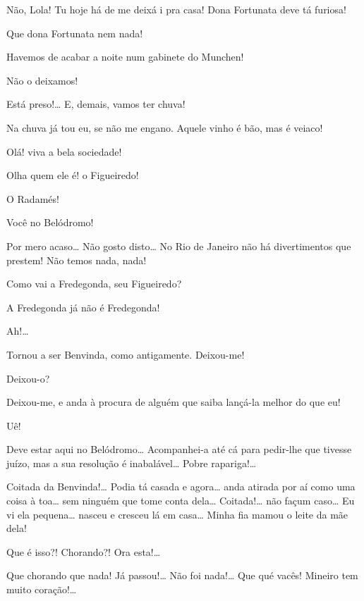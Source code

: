  Não, Lola! Tu hoje há de me deixá i pra casa! Dona Fortunata deve
tá furiosa!

 Que dona Fortunata nem nada!

 Havemos de acabar a noite num gabinete do Munchen!

 Não o deixamos!

 Está preso!\ldots{} E, demais, vamos ter chuva!

 Na chuva já tou eu, se não me engano. Aquele vinho é bão, mas é
veiaco!

  Olá! viva a bela sociedade!

 Olha quem ele é! o Figueiredo!

 O Radamés!

 Você no Belódromo!

 Por mero acaso\ldots{} Não gosto disto\ldots{} No Rio de Janeiro não há
divertimentos que prestem! Não temos nada, nada!

  Como vai a Fredegonda, seu Figueiredo?

 A Fredegonda já não é Fredegonda!

 Ah!\ldots{}

 Tornou a ser Benvinda, como antigamente. Deixou-me!

 Deixou-o?

 Deixou-me, e anda à procura de alguém que saiba lançá-la
melhor do que eu!

 Uê!

 Deve estar aqui no Belódromo\ldots{} Acompanhei-a até cá para
pedir-lhe que tivesse juízo, mas a sua resolução é inabalável\ldots{} Pobre rapariga!\ldots{}

  Coitada
da Benvinda!\ldots{} Podia tá casada e agora\ldots{} anda atirada por aí como uma coisa
à toa\ldots{} sem ninguém que tome conta dela\ldots{}  Coitada!\ldots{} não
façum caso\ldots{} Eu vi ela pequena\ldots{} nasceu e cresceu lá em casa\ldots{} 
Minha fia mamou o leite da mãe dela!

 Que é isso?! Chorando?! Ora esta!\ldots{}

  Que chorando que nada! Já passou!\ldots{} Não foi
nada!\ldots{} Que qué vacês! Mineiro tem muito coração!\ldots{}

